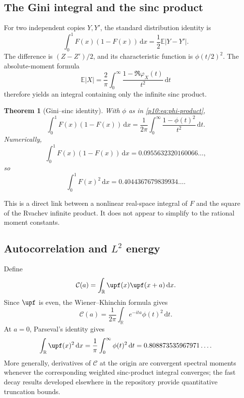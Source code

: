 \documentclass[11pt,oneside]{article}
\newtheorem{theorem}{Theorem}[section]
\theoremstyle{definition}
\theoremstyle{remark}
\newcommand{\F}{F}
\newcommand{\E}{\mathbb E}
\newcommand{\R}{\mathbb R}
\newcommand{\dd}{\,\mathrm d}
\newcommand{\1}{\mathbf 1}
\begin{document}
\subsection{The Gini integral and the sinc product}

For two independent copies \(Y,Y'\), the standard distribution identity is
\begin{equation}\label{p10:eq:Gini-prob}
 \int_0^1\F(x)(1-\F(x))\dd x
 =\frac12\E|Y-Y'|.
\end{equation}
The difference is \((Z-Z')/2\), and its characteristic function is
\(\phi(t/2)^2\).  The absolute-moment formula
\begin{equation}\label{p10:eq:absolute-char}
 \E|X|=\frac2\pi\int_0^\infty
 \frac{1-\Re\varphi_X(t)}{t^2}\dd t
\end{equation}
therefore yields an integral containing only the infinite sinc product.

\begin{theorem}[Gini--sinc identity]\label{p10:thm:gini-sinc}
With \(\phi\) as in \cref{p10:eq:phi-product},
\begin{equation}\label{p10:eq:Gini-sinc}
 \boxed{\displaystyle
 \int_0^1\F(x)(1-\F(x))\dd x
 =\frac1{2\pi}\int_0^\infty
 \frac{1-\phi(t)^2}{t^2}\dd t.}
\end{equation}
Numerically,
\begin{equation}\label{p10:eq:Gini-numeric}
 \int_0^1\F(x)(1-\F(x))\dd x
 =0.0955632320160066\ldots,
\end{equation}
so
\begin{equation}\label{p10:eq:F2-numeric}
 \int_0^1\F(x)^2\dd x
 =0.4044367679839934\ldots.
\end{equation}
\end{theorem}

This is a direct link between a nonlinear real-space integral of \(\F\) and the square
of the Rvachev infinite product.  It does not appear to simplify to the rational moment
constants.

\subsection{Autocorrelation and \(L^2\) energy}

Define
\begin{equation}\label{p10:eq:Cautocorr}
 \mathcal C(a)=\int_\R\upf(x)\upf(x+a)\dd x.
\end{equation}
Since \(\upf\) is even, the Wiener--Khinchin formula gives
\begin{equation}\label{p10:eq:autocorr-Fourier}
 \mathcal C(a)=\frac1{2\pi}
 \int_\R e^{-ita}\phi(t)^2\dd t.
\end{equation}
At \(a=0\), Parseval's identity gives
\begin{equation}\label{p10:eq:up-L2}
 \int_\R\upf(x)^2\dd x
 =\frac1\pi\int_0^\infty\phi(t)^2\dd t
 =0.808873535967971\ldots.
\end{equation}
More generally, derivatives of \(\mathcal C\) at the origin are convergent spectral
moments whenever the corresponding weighted sinc-product integral converges; the fast
decay results developed elsewhere in the repository provide quantitative truncation
bounds.
\end{document}
